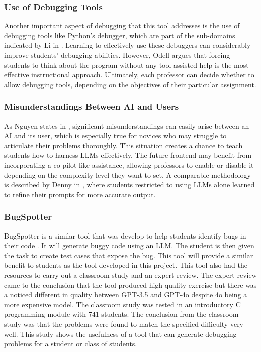 \documentclass[12pt]{extarticle}
\begin{document}
\subsubsection{Use of Debugging Tools}

Another important aspect of debugging that this tool addresses is the use of debugging tools like Python’s debugger, which are part of the sub-domains indicated by Li in \cite{li2019}. Learning to effectively use these debuggers can considerably improve students’ debugging abilities. However, Odell \cite{odell2017} argues that forcing students to think about the program without any tool-assisted help is the most effective instructional approach. Ultimately, each professor can decide whether to allow debugging tools, depending on the objectives of their particular assignment.

\subsubsection{Misunderstandings Between AI and Users}

As Nguyen states in \cite{nguyen2024}, significant misunderstandings can easily arise between an AI and its user, which is especially true for novices who may struggle to articulate their problems thoroughly. This situation creates a chance to teach students how to harness LLMs effectively. The future frontend may benefit from incorporating a co-pilot-like assistance, allowing professors to enable or disable it depending on the complexity level they want to set. A comparable methodology is described by Denny in \cite{denny2023}, where students restricted to using LLMs alone learned to refine their prompts for more accurate output.

\subsubsection{BugSpotter}

BugSpotter is a similar tool that was develop to help students identify bugs in their code \cite{Victor2025}. It will generate buggy code using an LLM. The student is then given the task to create test cases that expose the bug. This tool will provide a similar benefit to students as the tool developed in this project. This tool also had the resources to carry out a classroom study and an expert review. The expert review came to the conclusion that the tool produced high-quality exercise but there was a noticed different in quality between GPT-3.5 and GPT-4o despite 4o being a more expensive model. The classroom study was tested in an introductory C programming module with 741 students. The conclusion from the classroom study was that the problems were found to match the specified difficulty very well. This study shows the usefulness of a tool that can generate debugging problems for a student or class of students.
\end{document}
